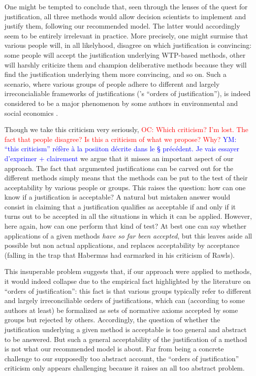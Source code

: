 \documentclass[preprint, french, english, 11pt, authoryear]{elsarticle}%
\newcommand{\commentYM}[1]{\textcolor{blue}{YM: #1}}
\newcommand{\commentOC}[1]{\textcolor{red}{OC: #1}}
\begin{document}
One might be tempted to conclude that, seen through the lenses of the quest for justification, all three methods would allow decision scientists to implement and justify them, following our recommended model. The latter would accordingly seem to be entirely irrelevant in practice. More precisely, one might surmise that various people will, in all likelyhood, disagree on which justification is convincing: some people will accept the justification underlying WTP-based methods, other will harshly criticize them and champion deliberative methods because they will find the justification underlying them more convincing, and so on. Such a scenario, where various groups of people adhere to different and largely irreconcialiable frameworks of justifications (\citep{boltanski_justification_2006}'s ``orders of justification''), is indeed considered to be a major phenomenon by some authors in environmental and social economics \citep{chateauraynaud_contrainte_2007}.

Though we take this criticism very seriously, 
\commentOC{Which criticism? I’m lost. The fact that people disagree? Is this a criticism of what we propose? Why?} \commentYM{``this criticism'' réfère à la posiiton décrite dans le § précédent. Je vais essayer d'exprimer + clairement}
we argue that it misses an important aspect of our approach. The fact that argumented justifications can be carved out for the different methods simply means that the methods can be put to the test of their acceptability by various people or groups. This raises the question: how can one know if a justification is acceptable? A natural but mistaken answer would consist in claiming that a justification qualifies as acceptable if and only if it turns out to be accepted in all the situations in which it can be applied. However, here again, how can one perform that kind of test? At best one can say whether applications of a given methods \emph{have so far been accepted}, but this leaves aside all possible but non actual applications, and replaces acceptability by acceptance (falling in the trap that Habermas had earmarked in his criticism of Rawls).

This insuperable problem suggests that, if our approach were applied to methods, it would indeed collapse due to the empirical fact highlighted by the literature on ``orders of justification'': this fact is that various groups typically refer to different and largely irreconciliable orders of justifications, which can (according to some authors at least) be formalized as sets of normative axioms accepted by some groups but rejected by others. Accordingly, the question of whether the justification underlying a given method is acceptable is too general and abstract to be answered. But such a general acceptability of the justification of a method is not what our recommended model is about. Far from being a concrete challenge to our supposedly too abstract account, the ``orders of justification'' criticism only appears challenging because it raises an all too abstract problem. 
\end{document}
